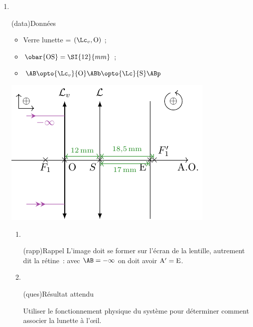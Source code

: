 \documentclass[../../main/main.tex]{subfiles}
\begin{document}
{\begin{enumerate}
		\item ~
		      \begin{center}
			      \begin{tcb}[sidebyside](data){Données}
				      \begin{itemize}
					      \item Verre lunette = $(\Lc_v, \rm O)$ ;
					      \item $\obar{\rm OS} = \SI{12}{mm}$ ;
					      \item $\AB \opto{\Lc_v}{\rm O} \ABb \opto{\Lc}{\rm S} \ABp$
				      \end{itemize}
				      \tcblower
				      \begin{center}
					      \includegraphics{oeil_hyper-verre.pdf}
				      \end{center}
			      \end{tcb}
		      \end{center}
		      \begin{enumerate}
			      \item ~
			            \begin{center}
				            \begin{tcb}[width=.5\linewidth](rapp){Rappel}
					            L'image doit se former sur l'écran de la lentille,
					            autrement dit la rétine~: avec $\AB = -\infty$ on doit
					            avoir $\rm A' = E$.
				            \end{tcb}
			            \end{center}
			      \item ~
			            \begin{tcbraster}[raster equal height=rows]
				            \begin{tcb}(ques){Résultat attendu}

					            Utiliser le fonctionnement physique du système pour
					            déterminer comment associer la lunette à l'œil.


\end{tcb}
\end{tcbraster}
\end{enumerate}
\end{enumerate}}
\end{document}
